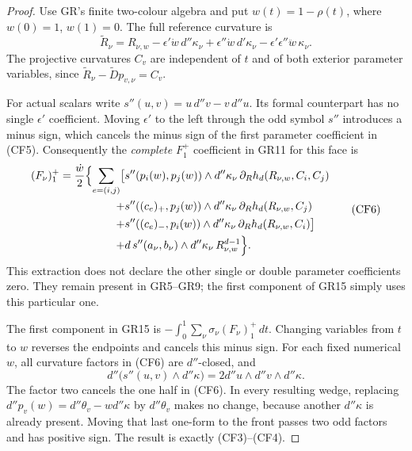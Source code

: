 \begin{proof}
Use GR's finite two-colour algebra and put $w(t)=1-\rho(t)$,
where $w(0)=1$, $w(1)=0$.  The full reference curvature is
\[
 \widetilde R_\nu
  =R_{\nu,w}-\epsilon'\dot w\,d''\kappa_\nu
       +\epsilon''\dot w\,d'\kappa_\nu
       -\epsilon'\epsilon''\ddot w\,\kappa_\nu.
 \tag{CF5}
\]
The projective curvatures $C_v$ are independent of $t$ and of
both exterior parameter variables, since
$\widetilde R_\nu-\widetilde Dp_{v,\nu}=C_v$.

For actual scalars write
$s''(u,v)=u\,d''v-v\,d''u$.  Its formal counterpart has no
single $\epsilon'$ coefficient.  Moving $\epsilon'$ to the
left through the odd symbol $s''$ introduces a minus sign,
which cancels the minus sign of the first parameter coefficient
in (CF5).  Consequently the \emph{complete} $F_1^+$ coefficient
in GR11 for this face is
\[
\begin{split}
 (F_\nu)_1^+
 =\frac{\dot w}{2}\Bigl\{\sum_{e=(i,j)}\bigl[
 &s''(p_i(w),p_j(w))\wedge d''\kappa_\nu\,
                         \partial_Rh_d(R_{\nu,w},C_i,C_j)\\
 +{}&s''((c_e)_+,p_j(w))\wedge d''\kappa_\nu\,
                         \partial_Rh_d(R_{\nu,w},C_j)\\
 +{}&s''((c_e)_-,p_i(w))\wedge d''\kappa_\nu\,
                         \partial_Rh_d(R_{\nu,w},C_i)\bigr]\\
 +{}&d\,s''(a_\nu,b_\nu)\wedge d''\kappa_\nu\,
                                      R_{\nu,w}^{d-1}\Bigr\}.
\end{split}
 \tag{CF6}
\]
This extraction does not declare the other single or double
parameter coefficients zero.  They remain present in GR5--GR9;
the first component of GR15 simply uses this particular one.

The first component in GR15 is
$-\int_0^1\sum_\nu\sigma_\nu(F_\nu)_1^+\,dt$.
Changing variables from $t$ to $w$ reverses the endpoints and
cancels this minus sign.  For each fixed numerical $w$, all
curvature factors in (CF6) are $d''$-closed, and
\[
 d''\bigl(s''(u,v)\wedge d''\kappa\bigr)
                  =2d''u\wedge d''v\wedge d''\kappa.
 \tag{CF7}
\]
The factor two cancels the one half in (CF6).  In every resulting
wedge, replacing $d''p_v(w)=d''\theta_v-wd''\kappa$ by
$d''\theta_v$ makes no change, because another $d''\kappa$
is already present.  Moving that last one-form to the front
passes two odd factors and has positive sign.  The result is
exactly (CF3)--(CF4).
\end{proof}

